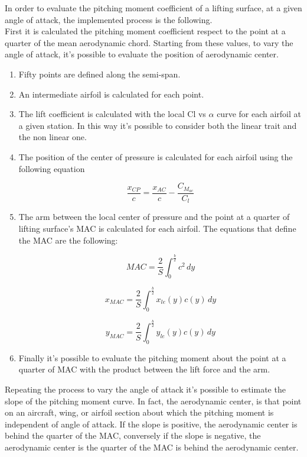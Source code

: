 In order to evaluate the pitching moment coefficient of a lifting surface, at a given angle of attack, the implemented process is the following.\\
First it is calculated the pitching moment coefficient respect to the point at a quarter of the mean aerodynamic chord. Starting from these values, to vary the angle of attack, it's possible to evaluate the position of aerodynamic center.

\begin{enumerate}

\item Fifty points are defined along the semi-span.
\item An intermediate airfoil is calculated for each point.
\item The lift coefficient is calculated with the local Cl vs  $\alpha$ curve for each airfoil at a given station. In this way it’s possible to consider both the linear trait and the non linear one.
\item The position of the center of pressure is calculated for each airfoil using the following equation

\begin {equation}
\frac{x_{CP}}{c} = \frac{x_{AC}}{c} - \frac{C_{M_{ac}}}{C_l}
\end{equation}

\item The arm between the local center of pressure and the point at a quarter of lifting surface’s MAC is calculated for each airfoil. The equations that define the MAC are the following:

\begin{equation}
MAC=\frac{2}{S} \int_{0}^{\frac{b}{2}} c^2\, dy
\end{equation}

\begin{equation}
x_{MAC}=\frac{2}{S} \int_{0}^{\frac{b}{2}}x_{le}(y) c(y)\, dy
\end{equation}

\begin{equation}
y_{MAC}=\frac{2}{S} \int_{0}^{\frac{b}{2}}y_{le}(y) c(y)\, dy
\end{equation}

\item Finally it’s possible to evaluate the pitching moment about the point at a quarter of MAC with the product between the lift force and the arm.
\end{enumerate}


Repeating the process to vary the angle of attack it's possible to estimate the slope of the pitching moment curve.  In fact, the aerodynamic center, is that point on an aircraft, wing, or airfoil section about which the pitching moment is independent of angle of attack.
If the slope is positive, the aerodynamic center is behind the quarter of the MAC, conversely if the slope is negative, the aerodynamic center is the quarter of the MAC is behind the aerodynamic center.

